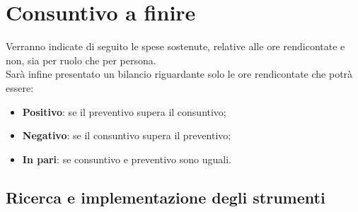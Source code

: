 %


\section{Consuntivo a finire} %
\label{sec:consuntivo_a_finire}
Verranno indicate di seguito le spese sostenute, relative alle ore rendicontate e non, sia per ruolo che per persona. \\
Sarà infine presentato un bilancio riguardante solo le ore rendicontate che potrà essere:
	\begin{itemize}
		\item \textbf{Positivo}: se il preventivo supera il consuntivo;
		\item \textbf{Negativo}: se il consuntivo supera il preventivo;
		\item \textbf{In pari}: se consuntivo e preventivo sono uguali.
	\end{itemize}
	\subsection{Ricerca e implementazione degli strumenti} %
	\label{sub:ricerca_e_implementazione_degli_strumenti}
